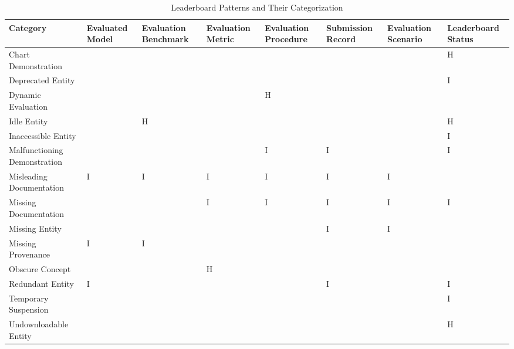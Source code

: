 \begin{table}
\caption{Leaderboard Patterns and Their Categorization}
\label{tab:pattern}
\begin{tabular}{llllllll}
\toprule
Category & Evaluated Model & Evaluation Benchmark & Evaluation Metric & Evaluation Procedure & Submission Record & Evaluation Scenario & Leaderboard Status \\
\midrule
Chart Demonstration &  &  &  &  &  &  & H \\
Deprecated Entity &  &  &  &  &  &  & I \\
Dynamic Evaluation &  &  &  & H &  &  &  \\
Idle Entity &  & H &  &  &  &  & H \\
Inaccessible Entity &  &  &  &  &  &  & I \\
Malfunctioning Demonstration &  &  &  & I & I & & I \\
Misleading Documentation & I & I & I & I & I & I &  \\
Missing Documentation &  &  & I & I & I & I & I \\
Missing Entity &  &  &  &  & I & I &  \\
Missing Provenance & I & I &  &  &  &  &  \\
Obscure Concept &  &  & H &  &  &  &  \\
Redundant Entity & I &  &  &  & I &  & I \\
Temporary Suspension &  &  &  &  &  &  & I \\
Undownloadable Entity &  &  &  &  &  &  & H \\
\bottomrule
\end{tabular}
\end{table}
